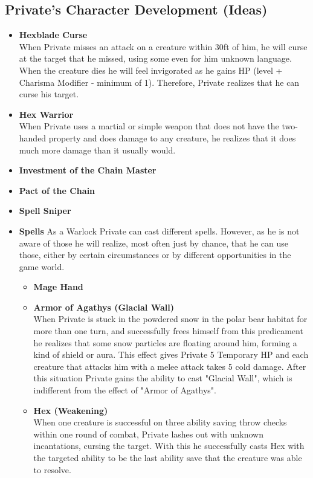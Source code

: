 \subsection*{Private's Character Development (Ideas)}
\begin{itemize}
	\item \textbf{Hexblade Curse}\\
	When Private misses an attack on a creature within 30ft of him, he will curse at the target that he missed, using some even for him unknown language. When the creature dies he will feel invigorated as he gains HP (level + Charisma Modifier - minimum of 1). Therefore, Private realizes that he can curse his target.
	\item \textbf{Hex Warrior}\\
	When Private uses a martial or simple weapon that does not have the two-handed property and does damage to any creature, he realizes that it does much more damage than it usually would.
	\item \textbf{Investment of the Chain Master}
	\item \textbf{Pact of the Chain}
	\item \textbf{Spell Sniper}
	\item \textbf{Spells}
	As a Warlock Private can cast different spells. However, as he is not aware of those he will realize, most often just by chance, that he can use those, either by certain circumstances or by different opportunities in the game world.
	\begin{itemize}
		\item \textcolor{titlered}{\textbf{Mage Hand}}\\
		\item \textcolor{titlered}{\textbf{Armor of Agathys (Glacial Wall)}}\\
		When Private is stuck in the powdered snow in the polar bear habitat for more than one turn, and successfully frees himself from this predicament he realizes that some snow particles are floating around him, forming a kind of shield or aura. This effect gives Private 5 Temporary HP and each creature that attacks him with a melee attack takes 5 cold damage. After this situation Private gains the ability to cast "Glacial Wall", which is indifferent from the effect of "Armor of Agathys".
		\item \textcolor{titlered}{\textbf{Hex (Weakening)}}\\
		When one creature is successful on three ability saving throw checks within one round of combat, Private lashes out with unknown incantations, cursing the target. With this he successfully casts Hex with the targeted ability to be the last ability save that the creature was able to resolve.\\

\end{itemize}
\end{itemize}
